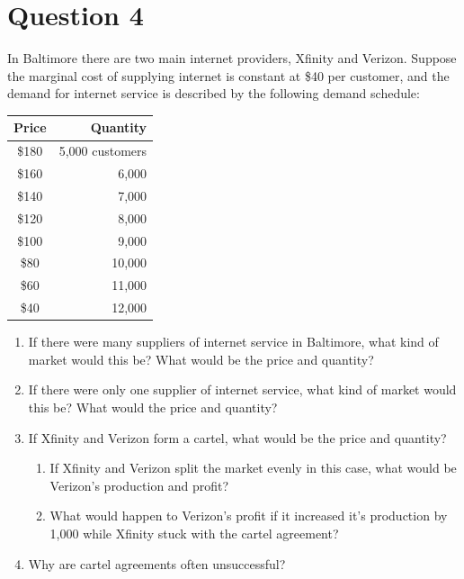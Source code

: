 \documentclass[12pt]{article}
\begin{document}
\section*{Question 4}
In Baltimore there are two main internet providers, Xfinity and Verizon. Suppose the marginal cost of supplying internet is constant at \$40 per customer, and the demand for internet service is described by the following demand schedule:
\begin{table}[H]
    \centering
    \begin{tabular}{c|r}
        Price & Quantity \\
        \hline
        \$180 & 5,000 customers \\ 
        \$160 & 6,000 \\ 
        \$140 & 7,000 \\ 
        \$120 & 8,000 \\ 
        \$100 & 9,000 \\ 
        \$80 & 10,000 \\ 
        \$60 & 11,000 \\ 
        \$40 & 12,000 \\
    \end{tabular}
    \label{tab:placeholder}
\end{table}
\begin{enumerate}[label = (\alph*)]
    \item If there were many suppliers of internet service in Baltimore, what kind of market would this be? What would be the price and quantity? 
    \item If there were only one supplier of internet service, what kind of market would this be? What would the price and quantity? 
    \item If Xfinity and Verizon form a cartel, what would be the price and quantity?
    \begin{enumerate}[label = (\roman*)]
        \item If Xfinity and Verizon split the market evenly in this case, what would be Verizon's production and profit?
        \item What would happen to Verizon's profit if it increased it's production by 1,000 while Xfinity stuck with the cartel agreement?
    \end{enumerate}
    \item Why are cartel agreements often unsuccessful?
\end{enumerate}
\end{document}
